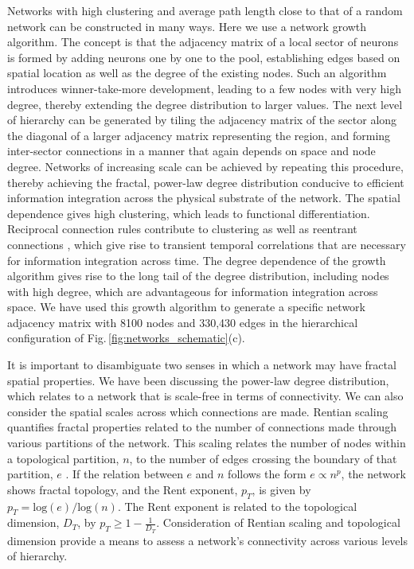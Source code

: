 \documentclass[twocolumn]{article}
\begin{document}
Networks with high clustering and average path length close to that of a random network can be constructed in many ways. Here we use a network growth algorithm. The concept is that the adjacency matrix of a local sector of neurons is formed by adding neurons one by one to the pool, establishing edges based on spatial location as well as the degree of the existing nodes. Such an algorithm introduces winner-take-more development, leading to a few nodes with very high degree, thereby extending the degree distribution to larger values. The next level of hierarchy can be generated by tiling the adjacency matrix of the sector along the diagonal of a larger adjacency matrix representing the region, and forming inter-sector connections in a manner that again depends on space and node degree. Networks of increasing scale can be achieved by repeating this procedure, thereby achieving the fractal, power-law degree distribution conducive to efficient information integration across the physical substrate of the network. The spatial dependence gives high clustering, which leads to functional differentiation. Reciprocal connection rules contribute to clustering as well as reentrant connections \cite{spto2000}, which give rise to transient temporal correlations that are necessary for information integration across time. The degree dependence of the growth algorithm gives rise to the long tail of the degree distribution, including nodes with high degree, which are advantageous for information integration across space. We have used this growth algorithm to generate a specific network adjacency matrix with 8100 nodes and 330,430 edges in the hierarchical configuration of Fig.\,\ref{fig:networks_schematic}(c). 

It is important to disambiguate two senses in which a network may have fractal spatial properties. We have been discussing the power-law degree distribution, which relates to a network that is scale-free in terms of connectivity. We can also consider the spatial scales across which connections are made. Rentian scaling quantifies fractal properties related to the number of connections made through various partitions of the network. This scaling relates the number of nodes within a topological partition, $n$, to the number of edges crossing the boundary of that partition, $e$ \cite{bagr2010}. If the relation between $e$ and $n$ follows the form $e\propto n^p$, the network shows fractal topology, and the Rent exponent, $p_T$, is given by $p_T = \mathrm{log}(e)/\mathrm{log}(n)$. The Rent exponent is related to the topological dimension, $D_T$, by $p_T \ge 1-\frac{1}{D_T}$. Consideration of Rentian scaling and topological dimension provide a means to assess a network's connectivity across various levels of hierarchy. 
\end{document}
